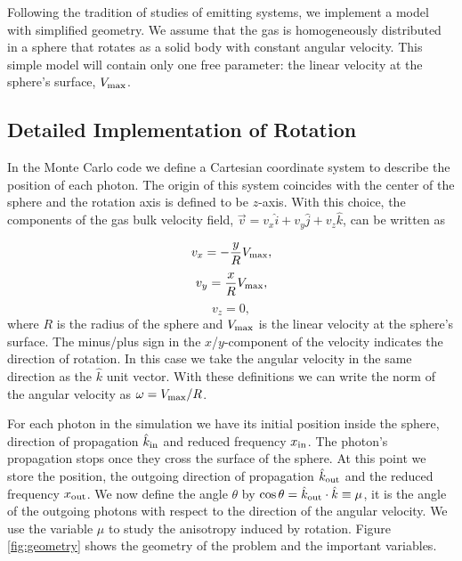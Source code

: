 \documentclass{emulateapj}
\newcommand{\ly}{{\ifmmode{{\rm Ly}\alpha~}\else{Ly$\alpha$~}\fi}}
\begin{document}
Following the tradition of studies of \ly emitting systems,
we implement a model with simplified geometry. We assume that the gas
is homogeneously distributed in a sphere that rotates as a solid body
with constant angular velocity. This simple model will contain only
one free parameter: the linear velocity at the sphere's surface, $V_{\rm
  max}$. 

\subsection{Detailed Implementation of Rotation}

 In the Monte Carlo code we define a Cartesian coordinate system to
 describe the position of each photon. The origin of this system
 coincides with the center of the sphere and the rotation axis is defined
 to be $z$-axis. With this choice, the components of the gas bulk velocity
 field, $\vec{v} = v_{x}\hat{i} + v_{y}\hat{j} + v_{z}\hat{k}$, can be
 written as  
  
\begin{equation}
    v_{x}=-\frac{y}{R}V_{\rm max}, \label{subeq1}
\end{equation}
\begin{equation}
    v_{y}=\frac{x}{R}V_{\rm max}, \label{subeq2}
\end{equation}
\begin{equation}
    v_{z}=0, \label{subeq3}
\end{equation}
%
where $R$ is the radius of the sphere and $V_{\rm max}$ is the linear
velocity at the sphere's surface. The minus/plus sign in the
$x$/$y$-component of the velocity indicates the direction of
rotation. In this case we take the angular velocity in the same
direction as the $\hat{k}$ unit vector. With these definitions we can
write the norm of the angular velocity as $\omega=V_{\rm max}/R$.  

For each photon in the simulation we have its initial position inside
the sphere, direction of propagation $\hat{k}_{\rm in}$ and reduced
frequency $x_{\rm in}$. The photon's propagation stops once they cross the
surface of the sphere. At this point we store the position, the outgoing direction
of propagation $\hat{k}_{\rm out}$ and the reduced frequency $x_{\rm
  out}$. We now define the angle $\theta$ by $\cos\theta = \hat{k}_{\rm out}\cdot
\hat{k}\equiv \mu$, it is the angle of the outgoing photons with 
respect to the direction of the angular velocity. We use the variable $\mu$ to
study the anisotropy induced by rotation. Figure \ref{fig:geometry}
shows the geometry of the problem and the important variables.
\end{document}

